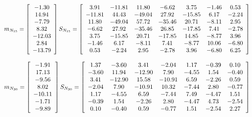 \documentclass{article}
\begin{document}
\[
m_{N_{15}}= \left[\begin{array}{*{1}c}
-1.30 \\
14.94 \\
-7.79 \\
8.32 \\
-12.03 \\
2.84 \\
-13.79 \\
\end{array}\right]
S_{N_{15}}= \left[\begin{array}{*{7}c}
3.91 & -11.81 & 11.80 & -6.62 & 3.75 & -1.46 & 0.53 \\
-11.81 & 44.43 & -49.04 & 27.92 & -15.85 & 6.17 & -2.24 \\
11.80 & -49.04 & 57.72 & -35.46 & 20.71 & -8.11 & 2.95 \\
-6.62 & 27.92 & -35.46 & 26.85 & -17.85 & 7.41 & -2.78 \\
3.75 & -15.85 & 20.71 & -17.85 & 14.85 & -8.77 & 3.96 \\
-1.46 & 6.17 & -8.11 & 7.41 & -8.77 & 10.06 & -6.80 \\
0.53 & -2.24 & 2.95 & -2.78 & 3.96 & -6.80 & 6.25 \\
\end{array}\right]
\]

\[
m_{N_{30}}= \left[\begin{array}{*{1}c}
-1.91 \\
17.13 \\
-9.56 \\
8.02 \\
-10.11 \\
-1.71 \\
-9.89 \\
\end{array}\right]
S_{N_{30}}= \left[\begin{array}{*{7}c}
1.37 & -3.60 & 3.41 & -2.04 & 1.17 & -0.39 & 0.10 \\
-3.60 & 11.94 & -12.90 & 7.90 & -4.55 & 1.54 & -0.40 \\
3.41 & -12.90 & 15.58 & -10.91 & 6.59 & -2.26 & 0.59 \\
-2.04 & 7.90 & -10.91 & 10.32 & -7.44 & 2.80 & -0.77 \\
1.17 & -4.55 & 6.59 & -7.44 & 7.49 & -4.47 & 1.51 \\
-0.39 & 1.54 & -2.26 & 2.80 & -4.47 & 4.73 & -2.54 \\
0.10 & -0.40 & 0.59 & -0.77 & 1.51 & -2.54 & 2.27 \\
\end{array}\right]
\]
\end{document}
